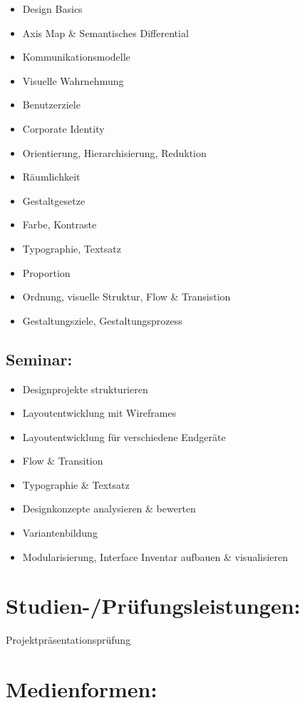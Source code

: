 \begin{itemize}
\tightlist
\item
  Design Basics
\item
  Axis Map \& Semantisches Differential
\item
  Kommunikationsmodelle
\item
  Visuelle Wahrnehmung
\item
  Benutzerziele
\item
  Corporate Identity
\item
  Orientierung, Hierarchisierung, Reduktion
\item
  Räumlichkeit
\item
  Gestaltgesetze
\item
  Farbe, Kontraste
\item
  Typographie, Textsatz
\item
  Proportion
\item
  Ordnung, visuelle Struktur, Flow \& Transistion
\item
  Gestaltungsziele, Gestaltungsprozess
\end{itemize}

\subsection*{Seminar:}\label{seminar}

\begin{itemize}
\tightlist
\item
  Designprojekte strukturieren
\item
  Layoutentwicklung mit Wireframes
\item
  Layoutentwicklung für verschiedene Endgeräte
\item
  Flow \& Transition
\item
  Typographie \& Textsatz
\item
  Designkonzepte analysieren \& bewerten
\item
  Variantenbildung
\item
  Modularisierung, Interface Inventar aufbauen \& visualisieren
\end{itemize}

\section*{Studien-/Prüfungsleistungen:}\label{studien-pruxfcfungsleistungen-19}

Projektpräsentationsprüfung

\section*{Medienformen:}\label{medienformen-12}

